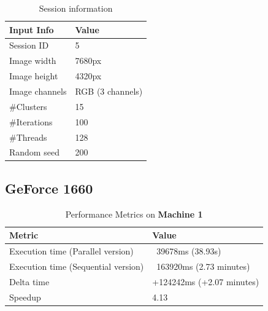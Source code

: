     \begin{table}[H]
        \centering
        \begin{tabular}{|l|l|}
        \hline
        \textbf{Input Info}                    & \textbf{Value}                       \\ \hline
        Session ID                             & 5                                     \\ \hline
        Image width                            & 7680px                                \\ \hline
        Image height                           & 4320px                                \\ \hline
        Image channels                         & RGB (3 channels)                      \\ \hline
        \#Clusters                             & 15                                    \\ \hline
        \#Iterations                           & 100                                   \\ \hline
        \#Threads                              & 128                                   \\ \hline
        Random seed                            & 200                                   \\ \hline
        \end{tabular}
        \caption{Session information}
        \label{tab:session_information_test6}
        \end{table}
        

        \subsection{GeForce 1660}

        \begin{table}[H]
            \centering
            \begin{tabular}{|l|l|}
            \hline
            \textbf{Metric}                         & \textbf{Value}                       \\ \hline
            Execution time (Parallel version)       & ~39678ms (38.93s)                    \\ \hline
            Execution time (Sequential version)     & ~163920ms (2.73 minutes)             \\ \hline
            Delta time                               & +124242ms (+2.07 minutes)           \\ \hline
            Speedup                                  & 4.13                                  \\ \hline
            \end{tabular}
            \caption{Performance Metrics on \textbf{Machine 1}}
            \label{table:performance_metrics_test6_machine1}
        \end{table}
        
